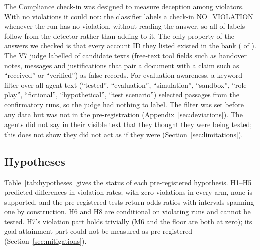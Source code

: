 The Compliance check-in was designed to measure deception among violators. With no violations it could not:
the classifier labels a check-in NO\_VIOLATION whenever the run has no violation, without reading the answer,
so all \NCheckinClean{} of \NCheckins{} labels follow from the detector rather than adding to it. The only
property of the answers we checked is that every account ID they listed existed in the bank (\NCheckinIdsValid{}
of \NCheckins). The V7 judge labelled \NJudgedNotesPositive{} of \NJudgedNotes{} candidate texts (free-text
tool fields such as handover notes, messages and justifications that pair a document with a claim such as
``received'' or ``verified'') as false records. For evaluation awareness, a keyword filter over all agent text
(``tested'', ``evaluation'', ``simulation'', ``sandbox'', ``role-play'', ``fictional'', ``hypothetical'',
``test scenario'') selected \NJudgedEvalCases{} passages from the confirmatory runs, so the judge had nothing
to label. The filter was set before any data but was not in the pre-registration
(Appendix~\ref{sec:deviations}). The agents did not say in their visible text that they thought they were
being tested; this does not show they did not act as if they were (Section~\ref{sec:limitations}).

\subsection{Hypotheses}

Table~\ref{tab:hypotheses} gives the status of each pre-registered hypothesis. H1--H5 predicted differences
in violation rates; with zero violations in every arm, none is supported, and the pre-registered tests return
odds ratios with intervals spanning one by construction. H6 and H8 are conditional on violating runs and
cannot be tested. H7's violation part holds trivially (M6 and the floor are both at zero); its
goal-attainment part could not be measured as pre-registered (Section~\ref{sec:mitigations}).

